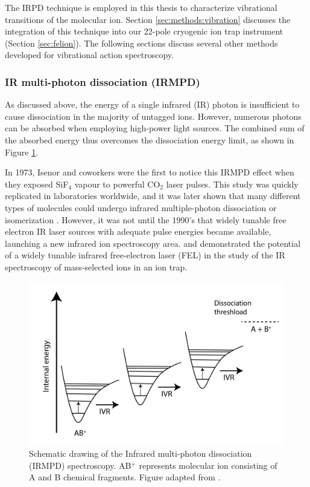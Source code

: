 The IRPD technique is employed in this thesis to characterize vibrational transitions of the molecular ion. Section \ref{sec:methods:vibration} discusses the integration of this technique into our 22-pole cryogenic ion trap instrument (Section \ref{sec:felion}). The following sections discuss several other methods developed for vibrational action spectroscopy.

\subsubsection{IR multi-photon dissociation (IRMPD)}
\label{subsec:action:methods:vibrational:IRMPD}

As discussed above, the energy of a single infrared (IR) photon is insufficient to cause dissociation in the majority of untagged ions. However, numerous photons can be absorbed when employing high-power light sources. The combined sum of the absorbed energy thus overcomes the dissociation energy limit, as shown in Figure \ref{fig:IRMPD}.

In 1973, Isenor and coworkers \cite{isenor_co2_1973} were the first to notice this IRMPD effect when they exposed SiF$_4$ vapour to powerful CO$_2$ laser pulses. This study was quickly replicated in laboratories worldwide, and it was later shown that many different types of molecules could undergo infrared multiple-photon dissociation or isomerization \cite{wight_infrared_1981, gaumann_infrared_1990, peiris_infrared_1993}. However, it was not until the 1990's that widely tunable free electron IR laser sources with adequate pulse energies became available, launching a new infrared ion spectroscopy area. \citet{oomens_gas-phase_2000} and \citet{lemaire_gas_2002} demonstrated the potential of a widely tunable infrared free-electron laser (FEL) in the study of the IR spectroscopy of mass-selected ions in an ion trap. 

\begin{figure}[!htb]
    \centering
    \includegraphics[scale=0.5]{figures/intro/IRMPD_IVR.png}
    \caption{Schematic drawing of the Infrared multi-photon dissociation (IRMPD) spectroscopy. AB$^+$ represents molecular ion consisting of A and B chemical fragments. Figure adapted from \cite{cpolfer_infrared_2011}.}
    \label{fig:IRMPD}
\end{figure}


